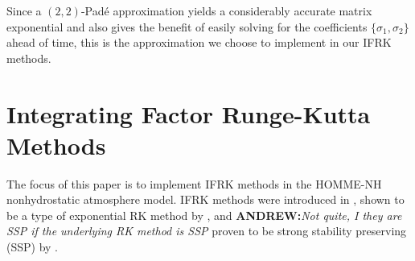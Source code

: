 \documentclass{csri19}
\newcommand{\A}[1]{\textbf{ANDREW:}\textit{#1}}
\begin{document}
Since a $(2,2)$-Pad\'e approximation yields a considerably accurate matrix 
exponential and also gives the benefit of easily solving for the 
coefficients $\{\sigma_1, \sigma_2\}$ ahead of time, this is the 
approximation we choose to implement in our IFRK methods.

\section{Integrating Factor Runge-Kutta Methods}\label{CFK:sec:ifrk}
The focus of this paper is to implement IFRK methods in the HOMME-NH 
nonhydrostatic atmosphere model. IFRK methods were introduced in 
\cite{CFK:Lawson1969}, shown to be a type of exponential RK method by
\cite{CFK:Minchev2006}, and \A{Not quite, I they are SSP if the underlying RK method is SSP} proven to be strong stability preserving (SSP) 
by \cite{CFK:Isherwood2018}.
\end{document}
